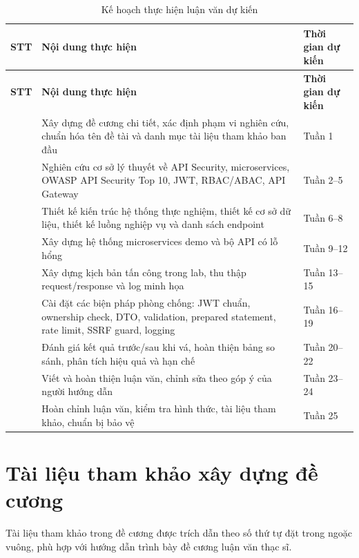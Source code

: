 \documentclass[14pt,a4paper]{extarticle}
\begin{document}
\begin{longtable}{>{\centering\arraybackslash}p{1.2cm}p{7.8cm}p{4.3cm}}
\caption{Kế hoạch thực hiện luận văn dự kiến}
\label{tab:plan}\\
\toprule
\textbf{STT} & \textbf{Nội dung thực hiện} & \textbf{Thời gian dự kiến}\\
\midrule
\endfirsthead
\toprule
\textbf{STT} & \textbf{Nội dung thực hiện} & \textbf{Thời gian dự kiến}\\
\midrule
\endhead
1 & Xây dựng đề cương chi tiết, xác định phạm vi nghiên cứu, chuẩn hóa tên đề tài và danh mục tài liệu tham khảo ban đầu & Tuần 1\\
2 & Nghiên cứu cơ sở lý thuyết về API Security, microservices, OWASP API Security Top 10, JWT, RBAC/ABAC, API Gateway & Tuần 2--5\\
3 & Thiết kế kiến trúc hệ thống thực nghiệm, thiết kế cơ sở dữ liệu, thiết kế luồng nghiệp vụ và danh sách endpoint & Tuần 6--8\\
4 & Xây dựng hệ thống microservices demo và bộ API có lỗ hổng & Tuần 9--12\\
5 & Xây dựng kịch bản tấn công trong lab, thu thập request/response và log minh họa & Tuần 13--15\\
6 & Cài đặt các biện pháp phòng chống: JWT chuẩn, ownership check, DTO, validation, prepared statement, rate limit, SSRF guard, logging & Tuần 16--19\\
7 & Đánh giá kết quả trước/sau khi vá, hoàn thiện bảng so sánh, phân tích hiệu quả và hạn chế & Tuần 20--22\\
8 & Viết và hoàn thiện luận văn, chỉnh sửa theo góp ý của người hướng dẫn & Tuần 23--24\\
9 & Hoàn chỉnh luận văn, kiểm tra hình thức, tài liệu tham khảo, chuẩn bị bảo vệ & Tuần 25\\
\bottomrule
\end{longtable}

\section{Tài liệu tham khảo xây dựng đề cương}

Tài liệu tham khảo trong đề cương được trích dẫn theo số thứ tự đặt trong ngoặc vuông, phù hợp với hướng dẫn trình bày đề cương luận văn thạc sĩ.
\end{document}
